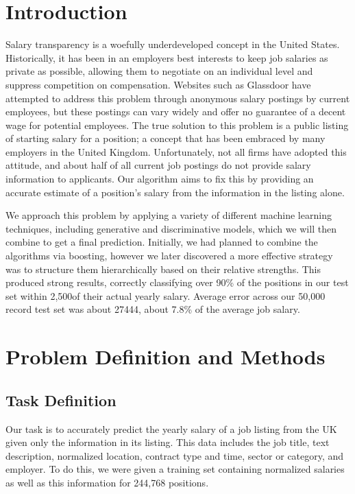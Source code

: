 \documentclass{pset}
\renewcommand\maketitle{
  \vspace*{-5em}
  \begin{center}\framebox{\parbox{\boxlength}{\bf
    CS 4780, Fall 2013\hfill Final Report\hfill 11 December 2013
  }}
  \end{center}
  \vspace{1em}
}
\begin{document}
\maketitle

\section{Introduction}
Salary transparency is a woefully underdeveloped concept in the United States.
Historically, it has been in an employers best interests to keep job salaries
as private as possible, allowing them to negotiate on an individual level and
suppress competition on compensation. Websites such as Glassdoor have attempted
to address this problem through anonymous salary postings by current employees,
but these postings can vary widely and offer no guarantee of a decent wage for
potential employees. The true solution to this problem is a public listing of
starting salary for a position; a concept that has been embraced by many
employers in the United Kingdom. Unfortunately, not all firms have adopted this
attitude, and about half of all current job postings do not provide salary
information to applicants. Our algorithm aims to fix this by providing an
accurate estimate of a position's salary from the information in the listing
alone. 

We approach this problem by applying a variety of different machine learning
techniques, including generative and discriminative models, which we will then
combine to get a final prediction. Initially, we had planned to combine the
algorithms via boosting, however we later discovered a more effective strategy
was to structure them hierarchically based on their relative strengths. This
produced strong results, correctly classifying over 90\% of the positions in
our test set within 2,500\textsterling of their actual yearly salary. Average
error across our 50,000 record test set was about 27444\textsterling, about
7.8\% of the average job salary.  

\section{Problem Definition and Methods}

\subsection{Task Definition}
Our task is to accurately predict the yearly salary of a job listing from the
UK given only the information in its listing. This data includes the job title,
text description, normalized location, contract type and time, sector or
category, and employer. To do this, we were given a training set containing
normalized salaries as well as this information for 244,768 positions.
\end{document}
